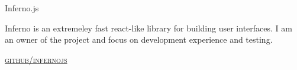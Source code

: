 {\raggedright
  {\large {
    Inferno.js
  } \\}


  Inferno is an extremeley fast react-like library for building user interfaces. I am an owner of the project and focus on development experience and testing.

  \textsc{\small\href{http://github.com/infernojs}{github/infernojs}}
} \\
